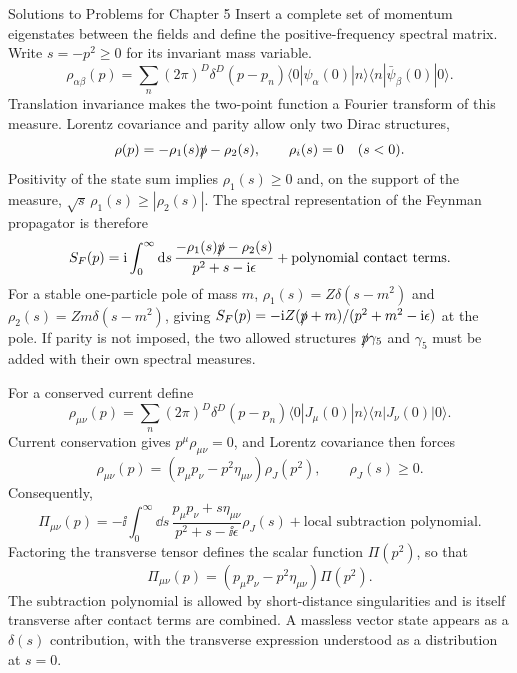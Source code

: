 \begin{bankssolutions}{Solutions to Problems for Chapter 5}
Insert a complete set of momentum eigenstates between the fields and define the
positive-frequency spectral matrix. Write $s=-p^2\geq0$ for its invariant mass
variable.
\begin{equation*}
 \rho_{\alpha\beta}(p)=\sum_n(2\pi)^D\delta^D(p-p_n)
 \langle0|\psi_\alpha(0)|n\rangle
 \langle n|\bar\psi_\beta(0)|0\rangle.
\end{equation*}
Translation invariance makes the two-point function a Fourier transform of this
measure. Lorentz covariance and parity allow only two Dirac structures,
\begin{equation*}
 \rho(p)=-\rho_1(s)\slashed p-\rho_2(s),
 \qquad \rho_i(s)=0\quad(s<0).
\end{equation*}
Positivity of the state sum implies $\rho_1(s)\geq0$ and, on the support of
the measure, $\sqrt{s}\,\rho_1(s)\geq|\rho_2(s)|$. The spectral representation of
the Feynman propagator is therefore
\begin{equation*}
 S_F(p)=\mathrm{i}\int_0^\infty\mathop{}\!\mathrm{d} s\,
 \frac{-\rho_1(s)\slashed p-\rho_2(s)}{p^2+s-\mathrm{i}\epsilon}
 +\text{polynomial contact terms}.
\end{equation*}
For a stable one-particle pole of mass $m$,
$\rho_1(s)=Z\delta(s-m^2)$ and $\rho_2(s)=Zm\delta(s-m^2)$, giving
$S_F(p)=-\mathrm{i} Z(\slashed p+m)/(p^2+m^2-\mathrm{i}\epsilon)$ at the pole. If parity is
not imposed, the two allowed structures $\slashed p\gamma_5$ and $\gamma_5$
must be added with their own spectral measures.

For a conserved current define
\begin{equation*}
 \rho_{\mu\nu}(p)=\sum_n(2\pi)^D\delta^D(p-p_n)
 \langle0|J_\mu(0)|n\rangle\langle n|J_\nu(0)|0\rangle.
\end{equation*}
Current conservation gives $p^\mu\rho_{\mu\nu}=0$, and Lorentz covariance then
forces
\begin{equation*}
 \rho_{\mu\nu}(p)=\left(p_\mu p_\nu-p^2\eta_{\mu\nu}\right)\rho_J(p^2),
 \qquad \rho_J(s)\geq0.
\end{equation*}
Consequently,
\begin{equation*}
 \Pi_{\mu\nu}(p)
 =-\ii\int_0^\infty\dd s\,
 \frac{p_\mu p_\nu+s\eta_{\mu\nu}}{p^2+s-\ii\epsilon}\rho_J(s)
 +\text{local subtraction polynomial}.
\end{equation*}
Factoring the transverse tensor defines the scalar function
$\Pi(p^2)$, so that
\begin{equation*}
 \Pi_{\mu\nu}(p)
 =(p_\mu p_\nu-p^2\eta_{\mu\nu})\Pi(p^2).
\end{equation*}
The subtraction polynomial is allowed by short-distance singularities and is
itself transverse after contact terms are combined. A massless vector state appears
as a $\delta(s)$ contribution, with the transverse expression understood as a
distribution at $s=0$.


\end{bankssolutions}
